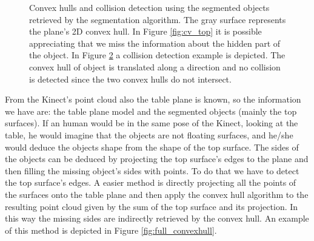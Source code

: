 \begin{figure}[tb]
\begin{subfigure}[t]{0.3\textwidth}
\caption{}\label{fig:cv_top_collision}
\end{subfigure}
\caption{Convex hulls and collision detection using the segmented objects retrieved by the  segmentation algorithm. The gray surface represents the plane's 2D convex hull. In Figure \ref{fig:cv_top} it is possible appreciating that we miss the information about the hidden part of the object. In Figure \ref{fig:cv_top_collision} a collision detection example is depicted. The convex hull of object  is translated along a direction and no collision is detected  since the two convex hulls do not intersect.}
\end{figure}

From the Kinect's point cloud also the table plane is known, so the information we have are: the table plane model and the segmented objects (mainly the top surfaces).
If an human would be in the same pose of the Kinect, looking at the table, he would imagine that the objects are not floating surfaces, and he/she would deduce the objects shape from the shape of the top surface. The sides of the objects can be deduced by projecting the top surface's edges to the plane and then filling the missing object's sides with points. To do that we have to detect the top surface's edges. A easier method is directly projecting all the points of the surfaces onto the table plane and then apply the convex hull algorithm to the resulting point cloud given by the sum of the top surface and its projection. In this way the missing sides are indirectly retrieved by the convex hull. An example of this method is depicted in Figure \ref{fig:full_convexhull}.

